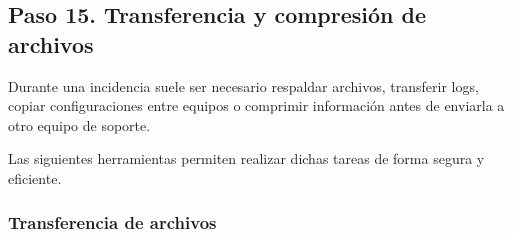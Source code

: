 \documentclass[a4paper,10pt]{article}
\begin{document}

\subsection{Paso 15. Transferencia y compresión de archivos}

Durante una incidencia suele ser necesario respaldar archivos, transferir logs,
copiar configuraciones entre equipos o comprimir información antes de enviarla
a otro equipo de soporte.

Las siguientes herramientas permiten realizar dichas tareas de forma segura y
eficiente.


\subsubsection{Transferencia de archivos}
\end{document}
